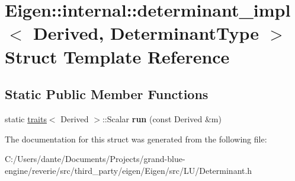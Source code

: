 \hypertarget{struct_eigen_1_1internal_1_1determinant__impl}{}\section{Eigen\+::internal\+::determinant\+\_\+impl$<$ Derived, Determinant\+Type $>$ Struct Template Reference}
\label{struct_eigen_1_1internal_1_1determinant__impl}
\subsection*{Static Public Member Functions}
\begin{DoxyCompactItemize}
\item 
\mbox{\label{struct_eigen_1_1internal_1_1determinant__impl_a0d3cebab002a146163b40eef69ff18b2}} 
static \mbox{\hyperlink{struct_eigen_1_1internal_1_1traits}{traits}}$<$ Derived $>$\+::Scalar {\bfseries run} (const Derived \&m)
\end{DoxyCompactItemize}


The documentation for this struct was generated from the following file\+:\begin{DoxyCompactItemize}
\item 
C\+:/\+Users/dante/\+Documents/\+Projects/grand-\/blue-\/engine/reverie/src/third\+\_\+party/eigen/\+Eigen/src/\+L\+U/Determinant.\+h\end{DoxyCompactItemize}
